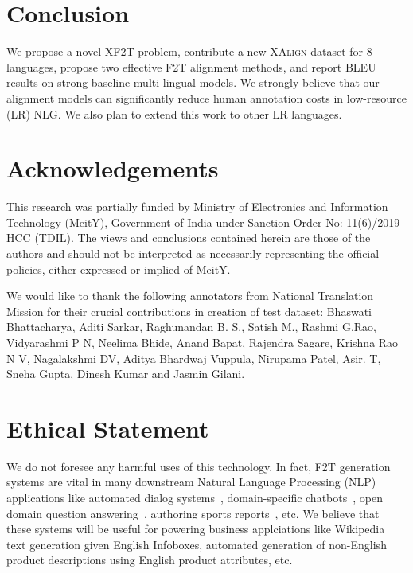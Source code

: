 \documentclass[11pt]{article}
\def\langCount{8}
\begin{document}
\section{Conclusion}
\label{sec:conclusion}
We propose a novel XF2T problem, contribute a new \textsc{XAlign} dataset for \langCount{} languages, propose two effective F2T alignment methods, and report BLEU results on strong baseline multi-lingual models. We strongly believe that our alignment models can significantly reduce human annotation costs in low-resource (LR) NLG. We also plan to extend this work to other LR languages.

\section*{Acknowledgements}
This research was partially funded by Ministry of Electronics and Information Technology (MeitY), Government of India under Sanction Order No: 11(6)/2019-HCC (TDIL). The views and conclusions contained herein are those of the authors and should not be interpreted as necessarily representing the official policies, either expressed or implied of MeitY.  

We would like to thank the following annotators from National Translation Mission for their crucial contributions in creation of test dataset: Bhaswati Bhattacharya, Aditi Sarkar, Raghunandan B. S., Satish M., Rashmi G.Rao, Vidyarashmi P N, Neelima Bhide, Anand Bapat, Rajendra Sagare, Krishna Rao N V, Nagalakshmi DV, Aditya Bhardwaj Vuppula, Nirupama Patel, Asir. T, Sneha Gupta, Dinesh Kumar and Jasmin Gilani.




\appendix
\section{Ethical Statement}
We do not foresee any harmful uses of this technology. In fact, F2T generation systems are vital in many downstream Natural Language Processing (NLP) applications like automated dialog systems~\cite{wen2016multi}, domain-specific chatbots~\cite{novikova2017e2e}, open domain question answering~\cite{chen2020kgpt}, authoring sports reports~\cite{chen2008learning}, etc. We believe that these systems will be useful for powering business applciations like Wikipedia text generation given English Infoboxes, automated generation of non-English product descriptions using English product attributes, etc.
\end{document}
